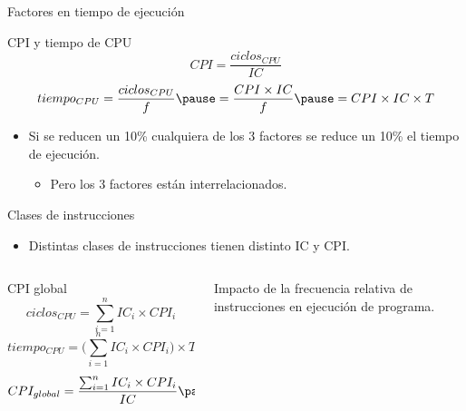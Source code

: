 \begin{frame}[t]{Factores en tiempo de ejecución}
\begin{block}{CPI y tiempo de CPU}
\begin{displaymath}
CPI=\frac{ciclos_{CPU}}{IC}
\end{displaymath}
\pause
\begin{displaymath}
tiempo_{CPU}=
\frac{ciclos_{CPU}}{f} \pause =
\frac{CPI \times IC}{f} \pause =
CPI \times IC \times T
\end{displaymath}
\end{block}
\begin{itemize}
  \item Si se reducen un 10\% cualquiera de los 3 factores 
        se reduce un 10\% el tiempo de ejecución.
    \begin{itemize}
      \item \alert{Pero los 3 factores están interrelacionados}.
    \end{itemize}
\end{itemize}
\end{frame}

\begin{frame}[t]{Clases de instrucciones}
\begin{itemize}
  \item Distintas clases de instrucciones tienen distinto IC y CPI.
\end{itemize}
\begin{columns}
\begin{column}{.7\textwidth}
\begin{block}{CPI global}
\begin{displaymath}
ciclos_{CPU}=\sum_{i=1}^n IC_i \times CPI_i
\end{displaymath}
\pause
\begin{displaymath}
tiempo_{CPU} =
\big( \sum_{i=1}^n IC_i \times CPI_i \big) \times T
\end{displaymath}
\pause
\begin{displaymath}
CPI_{global} = 
\frac
{\sum_{i=1}^n IC_i \times CPI_i}
{IC}
\pause =
\sum_{i=1}^n \frac{IC_i}{IC} \times CPI_i
\end{displaymath}
\end{block}
\end{column}
\begin{column}{.3\textwidth}
\pause
\alert{Impacto de la frecuencia relativa de instrucciones en ejecución de programa.}
\end{column}
\end{columns}
\end{frame}

